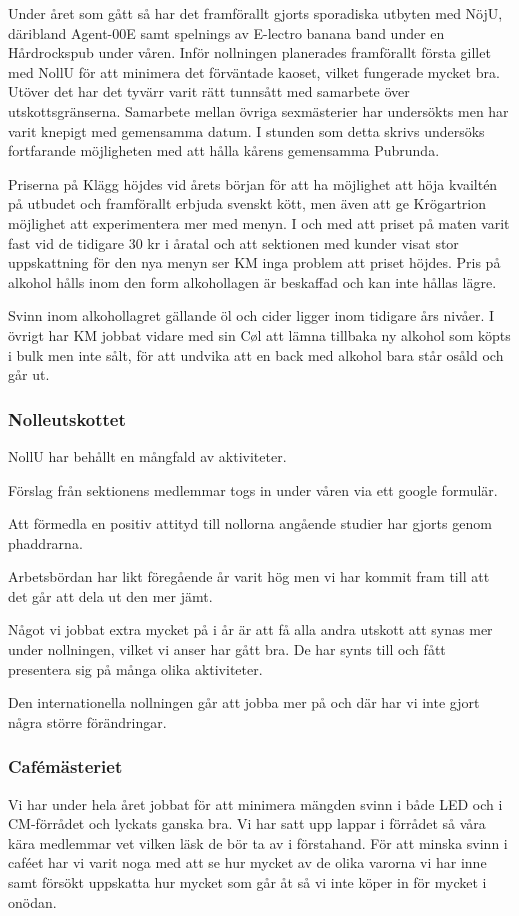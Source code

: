 \documentclass[../_main/handlingar.tex]{subfiles}
\begin{document}
Under året som gått så har det framförallt gjorts sporadiska utbyten med NöjU, däribland Agent-00E samt spelnings av E-lectro banana band under en Hårdrockspub under våren. Inför nollningen planerades framförallt första gillet med NollU för att minimera det förväntade kaoset, vilket fungerade mycket bra. Utöver det har det tyvärr varit rätt tunnsått med samarbete över utskottsgränserna. Samarbete mellan övriga sexmästerier har undersökts men har varit knepigt med gemensamma datum. I stunden som detta skrivs undersöks fortfarande möjligheten med att hålla kårens gemensamma Pubrunda.

Priserna på Klägg höjdes vid årets början för att ha möjlighet att höja kvailtén på utbudet och framförallt erbjuda svenskt kött, men även att ge Krögartrion möjlighet att experimentera mer med menyn. I och med att priset på maten varit fast vid de tidigare 30 kr i åratal och att sektionen med kunder visat stor uppskattning för den nya menyn ser KM inga problem att priset höjdes. Pris på alkohol hålls inom den form alkohollagen är beskaffad och kan inte hållas lägre.

Svinn inom alkohollagret gällande öl och cider ligger inom tidigare års nivåer. I övrigt har KM jobbat vidare med sin Cøl att lämna tillbaka ny alkohol som köpts i bulk men inte sålt, för att undvika att en back med alkohol bara står osåld och går ut.

\subsubsection*{Nolleutskottet}
NollU har behållt en mångfald av aktiviteter.

Förslag från sektionens medlemmar togs in under våren via ett google formulär.

Att förmedla en positiv attityd till nollorna angående studier har gjorts genom phaddrarna.

Arbetsbördan har likt föregående år varit hög men vi har kommit fram till att det går att dela ut den mer jämt.

Något vi jobbat extra mycket på i år är att få alla andra utskott att synas mer under nollningen, vilket vi anser har gått bra. De har synts till och fått presentera sig på många olika aktiviteter.

Den internationella nollningen går att jobba mer på och där har vi inte gjort några större förändringar.

\subsubsection*{Cafémästeriet}
Vi har under hela året jobbat för att minimera mängden svinn i både LED och i CM-förrådet och lyckats ganska bra. Vi har satt upp lappar i förrådet så våra kära medlemmar vet vilken läsk de bör ta av i förstahand. För att minska svinn i caféet har vi varit noga med att se hur mycket av de olika varorna vi har inne samt försökt uppskatta hur mycket som går åt så vi inte köper in för mycket i onödan.
\end{document}
